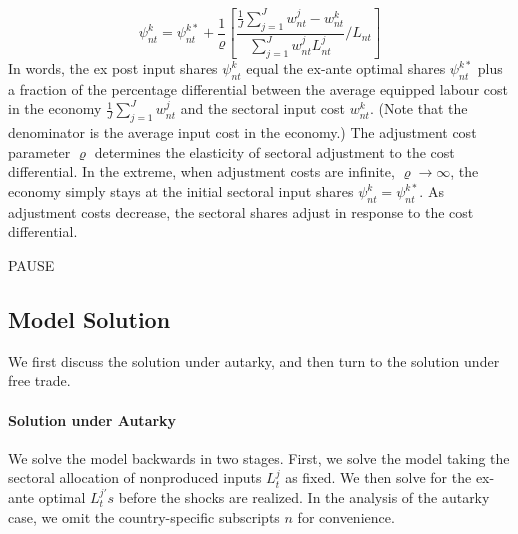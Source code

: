 \documentclass{article}
\begin{document}
\begin{equation*}
\psi _{nt}^{k}=\psi _{nt}^{k\ast }+\frac{1}{\varrho }\left[ \frac{\frac{1}{J}%
\sum_{j=1}^{J}w_{nt}^{j}-w_{nt}^{k}}{\sum_{j=1}^{J}w_{nt}^{j}L_{nt}^{j}}/L_{nt}%
\right] 
\end{equation*}%
In words, the ex post input shares $\psi _{nt}^{k}$ equal the ex-ante
optimal shares $\psi _{nt}^{k\ast }$ plus a fraction of the percentage differential
between the average equipped labour cost in the economy $\frac{1}{J}%
\sum_{j=1}^{J}w_{nt}^{j}$ and the sectoral input cost $w_{nt}^{k}$. 
(Note that the denominator is the average input cost in the economy.)
The
adjustment cost parameter $\varrho $ determines the elasticity of sectoral
adjustment to the cost differential. In the extreme, when adjustment costs
are infinite, $\varrho \rightarrow \infty $, the economy simply stays at the
initial sectoral input shares $\psi _{nt}^{k}=\psi _{nt}^{k\ast }$. As
adjustment costs decrease, the sectoral shares adjust in response to the
cost differential.

\bigskip

PAUSE

\subsection{Model Solution}

We first discuss the solution under autarky, and then turn to the solution
under free trade.

\paragraph{Solution under Autarky}

We solve the model backwards in two stages. First, we solve the model taking
the sectoral allocation of nonproduced inputs $L_{t}^{j}$ as fixed. We then
solve for the ex-ante optimal $L_{t}^{j\prime }s$ before the shocks are
realized. In the analysis of the autarky case, we omit the country-specific
subscripts $n$ for convenience.
\end{document}
